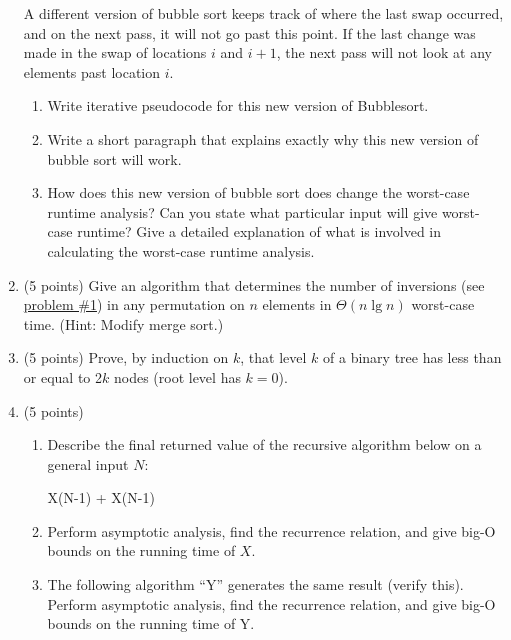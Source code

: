 \documentclass[1]{cs430homework}
\begin{document}
\begin{enumerate}[label=\arabic*.]
	A different version of bubble sort keeps track of where the last swap occurred, and on the next pass, it will not go past this point. If the last change was made in the swap of locations $i$ and $i+1$, the next pass will not look at any elements past location $i$.
	\begin{enumerate}[label=\arabic{enumi}\alph*)]
	    \item Write iterative pseudocode for this new version of Bubblesort.
		\item Write a short paragraph that explains exactly why this new version of bubble sort will work.
		\item How does this new version of bubble sort does change the worst-case runtime analysis? Can you state what particular input will give worst-case runtime?  Give a detailed explanation of what is involved in calculating the worst-case runtime analysis.
	\end{enumerate}
	\item (5 points) Give an algorithm that determines the number of inversions (see \hyperref[prb:1]{problem \#1}) in any permutation on $n$ elements in $\Theta(n \lg n)$ worst-case time. (Hint: Modify merge sort.)
	\item (5 points) Prove, by induction on $k$, that level $k$ of a binary tree has less than or equal to 2$k$ nodes (root level has $k=0$).
	\item (5 points)
	\begin{enumerate}[label=\arabic{enumi}\alph*)]
	    \item Describe the final returned value of the recursive algorithm below on a general input $N$:
		\begin{algorithm}[H]
			\label{alg:6a}
			\begin{algorithmic}[1]
					\State {}
				\Else
					\State \Return X(N-1) + X(N-1)
				\EndIf
			\EndFunction
			\end{algorithmic}
		\end{algorithm}
		\item Perform asymptotic analysis, find the recurrence relation, and give big-O bounds on the running time of $X$.
		\item The following algorithm ``Y'' generates the same result (verify this). Perform asymptotic analysis, find the recurrence relation, and give big-O bounds on the running time of Y.
		\begin{algorithm}[H]
			\label{alg:6c}
			\begin{algorithmic}[1]

\end{algorithmic}
\end{algorithm}
\end{enumerate}
\end{enumerate}
\end{document}
